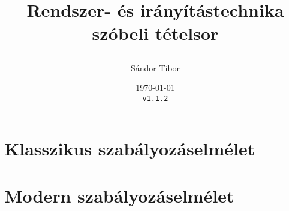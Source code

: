 \documentclass[a4paper,twoside,listof=totoc]{scrbook}
\title{
  Rendszer- és irányítástechnika \\
  szóbeli tételsor

}
\author{Sándor Tibor}
\date{
  \today \\
  \texttt{v1.1.2} \\
}
\numberwithin{equation}{section}
\begin{document}


\tableofcontents
\begingroup
\vfill
\let\cleardoublepage\relax
\listoffigures
\endgroup


\chapter{Klasszikus szabályozáselmélet}









\chapter{Modern szabályozáselmélet}

\setcounter{section}{7}









\end{document}
